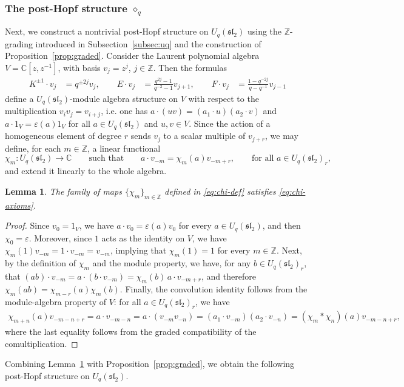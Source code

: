 \documentclass[11pt,english]{article}
\newcommand{\eps}{\varepsilon}
\newcommand{\act}{\mathbin{\diamond}}
\newtheorem{lemma}{Lemma}
\theoremstyle{definition}
\begin{document}
\subsubsection{The post-Hopf structure $\act_{q}$}

Next, we construct a nontrivial post-Hopf structure
on $U_q(\mathfrak{sl}_2)$ using the $\mathbb{Z}$-grading
introduced in Subsection~\ref{subsec:uq} and the construction of
Proposition~\ref{prop:graded}.
Consider the Laurent polynomial algebra
$V=\mathbb{C}[z,z^{-1}]$, with basis $v_j=z^j$,
$j\in\mathbb{Z}$. Then the formulas
\begin{equation}\label{eq:weight-rep}
\begin{aligned}
K^{\pm1}\cdot v_j&=q^{\pm2j}v_j, \qquad
E\cdot v_j&=\frac{q^{2j}-1}{q^{-2}-1}v_{j+1}, \qquad
F\cdot v_j&=\frac{1-q^{-2j}}{q-q^{-1}}v_{j-1}
\end{aligned}
\end{equation}
define a $U_q(\mathfrak{sl}_2)$-module algebra
structure on $V$ with respect to the multiplication
$v_iv_j=v_{i+j}$, i.e. one has $a \cdot (uv) = (a_1 \cdot u)(a_2 \cdot v)$ and $a \cdot 1_V = \varepsilon(a) 1_V$ for all $a \in U_q(\mathfrak{sl}_2)$ and $u,v \in V$.
Since the action of a homogeneous element of degree
$r$ sends $v_j$ to a scalar multiple of $v_{j+r}$,
we may define, for each $m\in\mathbb{Z}$, a linear functional
\begin{equation}\label{eq:chi-def}
\chi_m:U_q(\mathfrak{sl}_2)\to\mathbb{C} \qquad \text{such that} \qquad
a\cdot v_{-m}=\chi_m(a)v_{-m+r},
\qquad  \text{for all } a\in U_q(\mathfrak{sl}_2)_r,
\end{equation}
and extend it linearly to the whole algebra.

\begin{lemma}\label{lem:chi}
The family of maps $\{\chi_m\}_{m \in \mathbb{Z}}$ defined in \eqref{eq:chi-def} satisfies
\eqref{eq:chi-axioms}.
\end{lemma}

\begin{proof}
Since $v_0=1_V$,
we have $a\cdot v_0=\eps(a)v_0$ for every
$a\in U_q(\mathfrak{sl}_2)$, and then $\chi_0=\eps$.
Moreover, since $1$ acts as the identity on $V$,
we have $\chi_m(1)v_{-m}=1\cdot v_{-m}=v_{-m}$,
implying that $\chi_m(1)=1$ for every $m\in\mathbb{Z}$.
Next, by the definition of $\chi_m$ and the module
property, we have, for any $b\in U_q(\mathfrak{sl}_2)_r$, that $(ab)\cdot v_{-m}
=a\cdot(b\cdot v_{-m})
=\chi_m(b)\,a\cdot v_{-m+r}$, and therefore $\chi_m(ab)=\chi_{m-r}(a)\chi_m(b).$
Finally, the convolution identity follows from
the module-algebra property of $V$: for all
$a\in U_q(\mathfrak{sl}_2)_r$, we have
\[
\begin{aligned}
\chi_{m+n}(a)v_{-m-n+r}
=a\cdot v_{-m-n}=a\cdot(v_{-m}v_{-n})=(a_1\cdot v_{-m})(a_2\cdot v_{-n})=(\chi_m*\chi_n)(a)v_{-m-n+r},
\end{aligned}
\]
where the last equality follows from the graded
compatibility of the comultiplication.
\end{proof}
Combining Lemma~\ref{lem:chi} with
Proposition~\ref{prop:graded}, we obtain
the following post-Hopf structure on
$U_q(\mathfrak{sl}_2)$.
\end{document}
